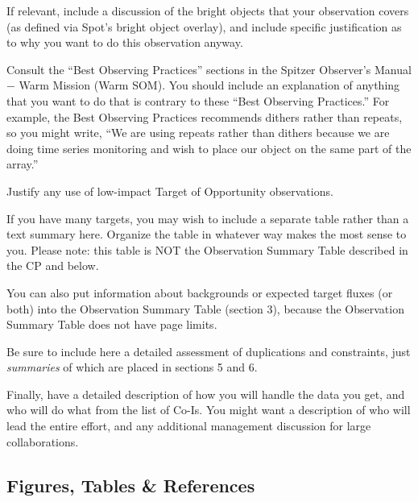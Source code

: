 \documentclass[letterpaper,12pt]{article}
\begin{document}
If relevant, include a discussion of the bright objects that
your observation covers (as defined via Spot's bright object
overlay), and include specific justification as to why you
want to do this observation anyway.\newline

Consult the ``Best Observing
Practices'' sections in the Spitzer Observer's Manual $-$ Warm Mission
(Warm SOM). You should include an explanation of anything that you 
want to do that is contrary to these ``Best Observing Practices.''  For
example, the Best Observing Practices recommends dithers rather
than repeats, so you might write, ``We are using 
repeats rather than dithers because we are doing time series
monitoring and wish to place our object on the same part of the
array.''\newline

Justify any use of low-impact Target of Opportunity observations. \newline

If you have many targets, you may wish to include a separate 
table rather than a text summary here. Organize the
table in whatever way makes the most sense to you.   
Please note: this table is NOT the Observation
Summary Table described in the CP and below.  \newline

You can also put information about backgrounds or expected target 
fluxes (or both) into the Observation Summary Table (section
3), because the Observation Summary Table does not have page
limits.  \newline

Be sure to include here a detailed assessment of duplications and 
constraints, just {\em summaries} of which are placed in
sections 5 and 6.\newline

Finally, have a detailed description of how you will handle the
data you get, and who will do what from the list of Co-Is.  You
might want a description of who will lead the entire effort, and
any additional management discussion for large collaborations. 

\subsection{Figures, Tables \& References}
\end{document}
